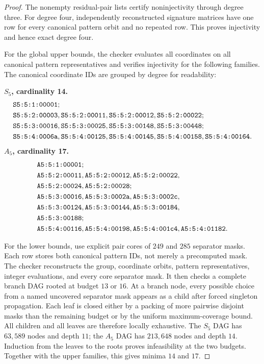\begin{proof}
The nonempty residual-pair lists certify noninjectivity through degree three.
For degree four, independently reconstructed signature matrices have one row
for every canonical pattern orbit and no repeated row.  This proves
injectivity and hence exact degree four.

For the global upper bounds, the checker evaluates all coordinates on all
canonical pattern representatives and verifies injectivity for the following
families.  The canonical coordinate IDs are grouped by degree for readability:
\begin{certificateblock}
\textbf{$S_5$, cardinality 14.}
\begin{align*}
&\texttt{S5:5:1:00001};\\
&\texttt{S5:5:2:00003},\texttt{S5:5:2:00011},
 \texttt{S5:5:2:00012},\texttt{S5:5:2:00022};\\
&\texttt{S5:5:3:00016},\texttt{S5:5:3:00025},
 \texttt{S5:5:3:00148},\texttt{S5:5:3:00448};\\
&\texttt{S5:5:4:0006a},\texttt{S5:5:4:00125},
 \texttt{S5:5:4:00145},\texttt{S5:5:4:00158},
 \texttt{S5:5:4:00164}.
\end{align*}
\textbf{$A_5$, cardinality 17.}
\begin{align*}
&\texttt{A5:5:1:00001};\\
&\texttt{A5:5:2:00011},\texttt{A5:5:2:00012},
 \texttt{A5:5:2:00022},\\
&\texttt{A5:5:2:00024},\texttt{A5:5:2:00028};\\
&\texttt{A5:5:3:00016},\texttt{A5:5:3:0002a},
 \texttt{A5:5:3:0002c},\\
&\texttt{A5:5:3:00124},\texttt{A5:5:3:00144},
 \texttt{A5:5:3:00184},\\
&\texttt{A5:5:3:00188};\\
&\texttt{A5:5:4:00116},\texttt{A5:5:4:00198},
 \texttt{A5:5:4:001c4},\texttt{A5:5:4:01182}.
\end{align*}
\end{certificateblock}

For the lower bounds, use explicit pair cores of $249$ and $285$ separator
masks.  Each row stores both canonical pattern IDs, not merely a precomputed
mask.  The checker reconstructs the group, coordinate orbits, pattern
representatives, integer evaluations, and every core separator mask.  It then
checks a complete branch DAG rooted at budget $13$ or $16$.  At a branch node,
every possible choice from a named uncovered separator mask appears as a
child after forced singleton propagation.  Each leaf is closed either by a
packing of more pairwise disjoint masks than the remaining budget or by the
uniform maximum-coverage bound.  All children and all leaves are therefore
locally exhaustive.  The $S_5$ DAG has $63{,}589$ nodes and depth $11$; the
$A_5$ DAG has $213{,}648$ nodes and depth $14$.  Induction from the leaves to
the roots proves infeasibility at the two budgets.  Together with the upper
families, this gives minima $14$ and $17$.
\end{proof}

